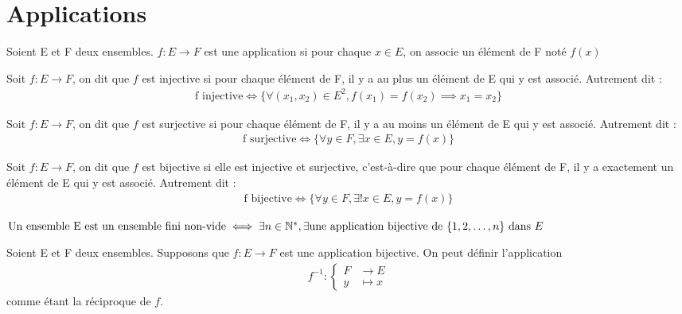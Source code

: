 \chapter{Applications}
\begin{definition}[Application]
	Soient E et F deux ensembles. $f:E \to F$ est une application si pour chaque $x \in E$, on associe un élément de F noté $f(x)$
\end{definition}

\begin{definition}[Injectivité]
	Soit $f:E \to F$, on dit que $f$ est injective si pour chaque élément de F, il y a au plus un élément de E qui y est associé. Autrement dit :
	\begin{align*}
		\text{f injective} \iff \{\forall (x_1, x_2) \in E^2, f(x_1) = f(x_2) \implies x_1 = x_2\}
	\end{align*}
\end{definition}

\begin{definition}[Surjectivité]
	Soit $f:E \to F$, on dit que $f$ est surjective si pour chaque élément de F, il y a au moins un élément de E qui y est associé.
	Autrement dit :
	\begin{align*}
		\text{f surjective} \iff \{\forall y \in F, \exists x \in E, y = f(x)\}
	\end{align*}
\end{definition}

\begin{definition}[Bijectivité]
	Soit $f:E \to F$, on dit que $f$ est bijective si elle est injective et surjective, c'est-à-dire que pour chaque élément de F, il y a exactement un élément de E qui y est associé.
	Autrement dit :
	\begin{align*}
		\text{f bijective} \iff \{\forall y \in F, \exists! x \in E, y = f(x)\}
	\end{align*}
\end{definition}

\begin{definition}
	$
		\text{Un ensemble E est un ensemble fini non-vide} \iff \exists n \in \mathbb{N}^*, \exists \text{une application bijective de } \{1,2,\ldots,n\} \text{ dans } E
	$
\end{definition}

\begin{definition}
	Soient E et F deux ensembles. Supposons que $f:E \to F$ est une application bijective. On peut définir l'application 
	\begin{align*}
		f^{-1} : 
		\begin{cases}
			F &\to E \\
			y &\mapsto x
		\end{cases}
	\end{align*}
	comme étant la réciproque de $f$.
\end{definition}

